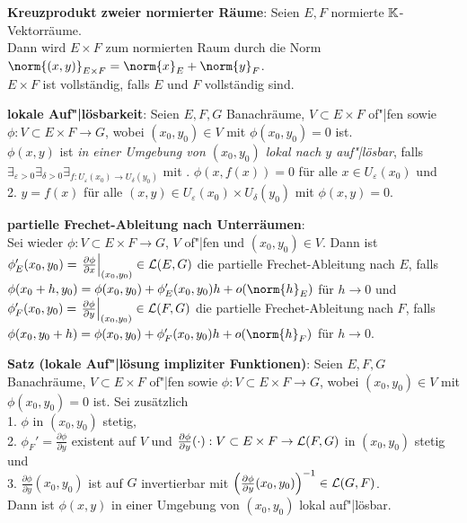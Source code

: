 \linie

\textbf{Kreuzprodukt zweier normierter Räume}:
Seien $E, F$ normierte $\mathbb{K}$-Vektorräume. \\
Dann wird $E \times F$ zum normierten Raum durch die Norm
$\norm{(x, y)}_{E \times F} = \norm{x}_E + \norm{y}_F$. \\
$E \times F$ ist vollständig, falls $E$ und $F$ vollständig sind.

\textbf{lokale Auf"|lösbarkeit}:
Seien $E, F, G$ Banachräume, $V \subset E \times F$ of"|fen
sowie $\phi: V \subset E \times F \rightarrow G$, wobei
$(x_0, y_0) \in V$ mit $\phi(x_0, y_0) = 0$ ist. \\
$\phi(x, y)$ ist \emph{in einer Umgebung von $(x_0, y_0)$ lokal nach $y$
auf"|lösbar}, falls \\
$\exists_{\varepsilon > 0} \exists_{\delta > 0}
\exists_{f: U_\varepsilon(x_0) \rightarrow U_\delta(y_0)}$ mit . $\phi(x, f(x)) = 0$ für alle $x \in U_\varepsilon(x_0)$ und \\
2. $y = f(x)$ für alle $(x, y) \in U_\varepsilon(x_0) \times U_\delta(y_0)$
mit $\phi(x, y) = 0$.

\textbf{partielle Frechet-Ableitung nach Unterräumen}: \\
Sei wieder $\phi: V \subset E \times F \rightarrow G$,
$V$ of"|fen und $(x_0, y_0) \in V$.
Dann ist \\
$\phi_E'(x_0, y_0) =
\left.\frac{\partial \phi}{\partial x}\right|_{(x_0,y_0)} \in \mathcal{L}(E,G)$
die partielle Frechet-Ableitung nach $E$, falls \\
$\phi(x_0 + h, y_0) = \phi(x_0, y_0) + \phi_E'(x_0, y_0)h + o(\norm{h}_E)$
für $h \to 0$ und \\
$\phi_F'(x_0, y_0) =
\left.\frac{\partial \phi}{\partial y}\right|_{(x_0,y_0)} \in \mathcal{L}(F,G)$
die partielle Frechet-Ableitung nach $F$, falls \\
$\phi(x_0, y_0 + h) = \phi(x_0, y_0) + \phi_F'(x_0, y_0)h + o(\norm{h}_F)$
für $h \to 0$.

\linie

\textbf{Satz (lokale Auf"|lösung impliziter Funktionen)}:
Seien $E, F, G$ Banachräume, $V \subset E \times F$ of"|fen
sowie $\phi: V \subset E \times F \rightarrow G$, wobei
$(x_0, y_0) \in V$ mit $\phi(x_0, y_0) = 0$ ist.
Sei zusätzlich \\
1. $\phi$ in $(x_0, y_0)$ stetig, \\
2. $\phi_F' = \frac{\partial \phi}{\partial y}$ existent auf $V$ und
$\frac{\partial \phi}{\partial y}(\cdot): V \subset E \times F \rightarrow
\mathcal{L}(F,G)$ in $(x_0, y_0)$ stetig und \\
3. $\frac{\partial \phi}{\partial y}(x_0, y_0)$ ist auf $G$ invertierbar mit
$\left(\frac{\partial \phi}{\partial y}(x_0, y_0)\right)^{-1} \in \mathcal{L}(G,F)$. \\
Dann ist $\phi(x, y)$ in einer Umgebung von $(x_0, y_0)$ lokal auf"|lösbar.

